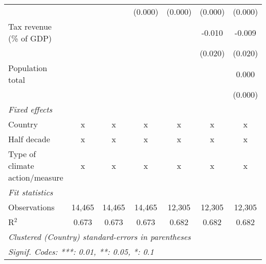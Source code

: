 \begin{tabular}{lcccccc}
                                                                                    &               &               & (0.000)      & (0.000)      & (0.000)      & (0.000)\\   
   Tax revenue (\% of GDP)                                                          &               &               &              &              & -0.010       & -0.009\\   
                                                                                    &               &               &              &              & (0.020)      & (0.020)\\   
   Population total                                                                 &               &               &              &              &              & 0.000\\   
                                                                                    &               &               &              &              &              & (0.000)\\   
   \emph{Fixed effects}\\
   Country                                                                          & x             & x             & x            & x            & x            & x\\  
   Half decade                                                                      & x             & x             & x            & x            & x            & x\\  
   Type of climate action/measure                                                   & x             & x             & x            & x            & x            & x\\  
   \midrule \emph{Fit statistics}\\
   Observations                                                                     & 14,465        & 14,465        & 14,465       & 12,305       & 12,305       & 12,305\\  
   R$^2$                                                                            & 0.673         & 0.673         & 0.673        & 0.682        & 0.682        & 0.682\\  
   \midrule
   \multicolumn{7}{l}{\emph{Clustered (Country) standard-errors in parentheses}}\\
   \multicolumn{7}{l}{\emph{Signif. Codes: ***: 0.01, **: 0.05, *: 0.1}}\\
\end{tabular}
\par\endgroup


